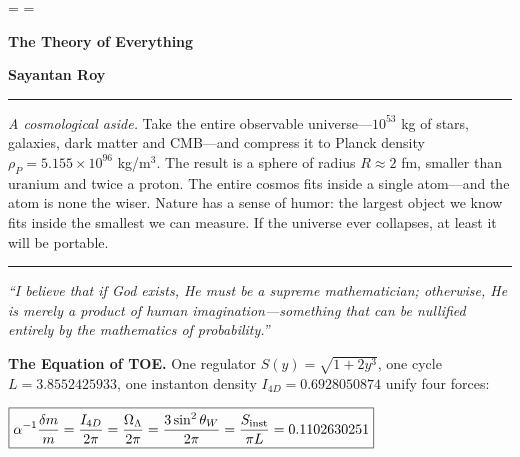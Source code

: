 \documentclass[12pt,oneside,openany]{book}
\begin{document}
\pagestyle{plain}
\sloppy
\hfuzz=\maxdimen
\vfuzz=\maxdimen

\begin{titlepage}
\centering
{}

\vspace*{1.2cm}

{\Huge\bfseries The Theory of Everything\par}
\vspace{0.3cm}


\vspace{0.8cm}
{\Large\bfseries Sayantan Roy\par}

\vspace{0.8cm}
\rule{0.7\textwidth}{0.6pt}

\vspace{0.8cm}
\begin{minipage}{0.82\textwidth}
\centering
\footnotesize\textit{A cosmological aside.} Take the entire observable universe---$10^{53}$ kg of stars, galaxies, dark matter and CMB---and compress it to Planck density $\rho_P=5.155\times10^{96}$ kg/m$^3$. The result is a sphere of radius $R\approx2$ fm, smaller than uranium and twice a proton. The entire cosmos fits inside a single atom---and the atom is none the wiser. Nature has a sense of humor: the largest object we know fits inside the smallest we can measure. If the universe ever collapses, at least it will be portable.
\end{minipage}
\vspace{0.8cm}
\rule{0.7\textwidth}{0.6pt}

\vspace{0.8cm}
\begin{minipage}{0.8\textwidth}
\centering
\small\itshape
``I believe that if God exists, He must be a supreme mathematician; otherwise, He is merely a product of human imagination---something that can be nullified entirely by the mathematics of probability.''
\end{minipage}


\begin{minipage}{0.88\textwidth}
\centering
\small
\textbf{The Equation of TOE.} One regulator $S(y)=\sqrt{1+2y^3}$, one cycle $L=3.8552425933$, one instanton density $I_{4D}=0.6928050874$ unify four forces:

\vspace{0.3cm}
\large
$\displaystyle \boxed{
\alpha^{-1}\frac{\delta m}{m}= \frac{I_{4D}}{2\pi}= \frac{\Omega_\Lambda}{2\pi}= \frac{3\sin^2\theta_W}{2\pi}= \frac{S_{\rm inst}}{\pi L}=0.1102630251}$


\end{minipage}
\end{titlepage}
\end{document}
